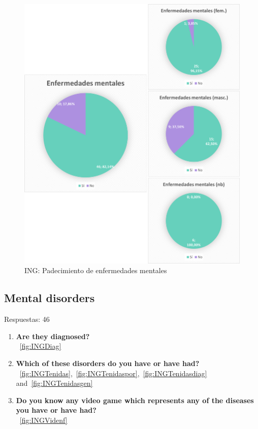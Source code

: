 \documentclass[12pt, a4paper,twoside,titlepage]{book}
\begin{document}
\begin{figure}
    \centering
    \includegraphics[width=1\linewidth]{ANEXO ING/19AnexINGEnf}
    \caption{ING: Padecimiento de enfermedades mentales}
    \label{fig:INGEnfer}
\end{figure}


\subsection{Mental disorders}
Respuestas: 46
\begin{enumerate}[label=\textbf{\arabic*}.]
     \item \textbf{Are they diagnosed?}\\
    ~\ref{fig:INGDiag}
     \item \textbf{Which of these disorders do you have or have had? }\\
    ~\ref{fig:INGTenidas},~\ref{fig:INGTenidaspor},~\ref{fig:INGTenidasdiag} and~\ref{fig:INGTenidasgen}
     \item \textbf{Do you know any video game which represents any of the diseases you have or have had?}\\
    ~\ref{fig:INGVidenf}
\end{enumerate}
\end{document}
